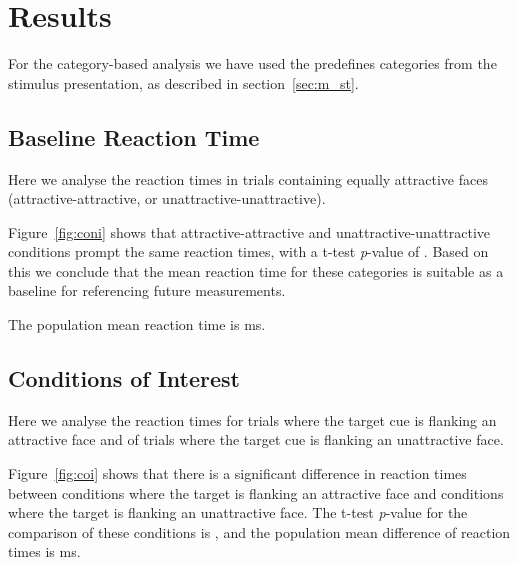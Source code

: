 \section{Results}                                    
    For the category-based analysis we have used the predefines categories from the stimulus presentation, as described in section~\ref{sec:m_st}. 
    \subsection{Baseline Reaction Time}\label{sec:r_brt}
		Here we analyse the reaction times in trials containing equally attractive faces (attractive-attractive, or unattractive-unattractive).
		
		
		Figure~\ref{fig:coni} shows that attractive-attractive and unattractive-unattractive conditions prompt the same reaction times, with a t-test \textit{p}-value of 
		. 
		Based on this we conclude that the mean reaction time for these categories is suitable as a baseline for referencing future measurements.
		
		The population mean reaction time is
		 ms.
    \subsection{Conditions of Interest}\label{sec:r_coi}
		Here we analyse the reaction times for trials where the target cue is flanking an attractive face and of trials where the target cue is flanking an unattractive face.
		
		
		Figure~\ref{fig:coi} shows that there is a significant difference in reaction times between conditions where the target is flanking an attractive face and conditions where the target is flanking an unattractive face.
		The t-test \textit{p}-value for the comparison of these conditions is 
		,
		and the population mean difference of reaction times is
		 ms.
		
